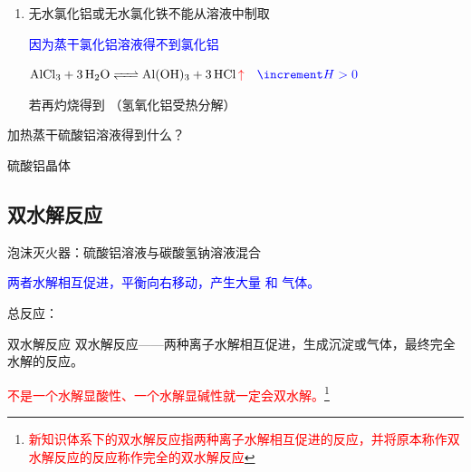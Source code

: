 \begin{enumerate}
                    与  反应，由于酸性较弱，很难与  反应。

                    \item 无水氯化铝或无水氯化铁不能从溶液中制取
                    
                    \textcolor{blue}{因为蒸干氯化铝溶液得不到氯化铝}
                    
                    \(\cemh{AlCl3 + 3H2O <=> Al(OH)3 + 3HCl \mathcolor{red}{\uparrow}} \quad \mathcolor{blue}{\increment H>0}\)
                    
                    若再灼烧得到 （氢氧化铝受热分解）

                \end{enumerate}

                \begin{pbm}{加热蒸干硫酸铝溶液得到什么？}
                \end{pbm}

                \begin{slt}
                硫酸铝晶体
                \end{slt}

            \subsection{双水解反应}\label{subsec:双水解反应}

                泡沫灭火器：硫酸铝溶液与碳酸氢钠溶液混合
                    
                    
                    
                \textcolor{blue}{两者水解相互促进，平衡向右移动，产生大量  和  气体。}
                    
                总反应：
                
                \begin{dfn}{双水解反应}
                    双水解反应——两种离子水解相互促进，生成沉淀或气体，最终完全水解的反应。
                \end{dfn}

                    \textcolor{red}{不是一个水解显酸性、一个水解显碱性就一定会双水解。}\footnote{\textcolor{red}{新知识体系下的双水解反应指两种离子水解相互促进的反应，并将原本称作双水解反应的反应称作完全的双水解反应}}
                    
